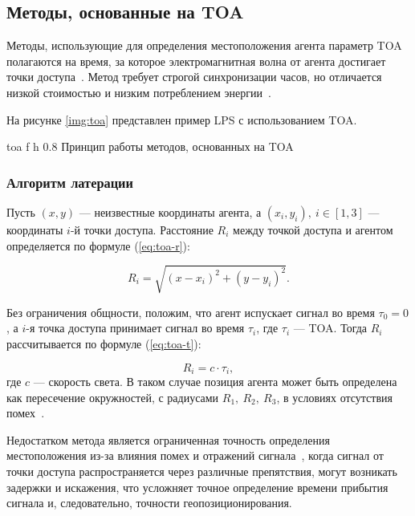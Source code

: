 \clearpage

\subsection{Методы, основанные на TOA}

Методы, использующие для определения местоположения агента параметр TOA полагаются на время, за которое электромагнитная волна от агента достигает точки доступа~\cite{trends}. Метод требует строгой синхронизации часов, но отличается низкой стоимостью и низким потреблением энергии~\cite{toa}.

На рисунке \ref{img:toa} представлен пример LPS с использованием TOA.

    {toa}
    {f}
    {h}
    {0.8\linewidth}
    {Принцип работы методов, основанных на TOA}

\subsubsection{Алгоритм латерации}

Пусть $(x, y)$ --- неизвестные координаты агента, а $(x_i, y_i),~i \in [1, 3]$ --- координаты $i$-й точки доступа. Расстояние $R_i$ между точкой доступа и агентом определяется по формуле (\ref{eq:toa-r}):

\begin{equation}
    R_i = \sqrt{(x - x_i)^2 + (y - y_i)^2}.
    \label{eq:toa-r}
\end{equation}

Без ограничения общности, положим, что агент испускает сигнал во время $\tau_0 = 0$, а $i$-я точка доступа принимает сигнал во время $\tau_i$, где $\tau_i$ --- TOA. Тогда $R_i$ рассчитывается по формуле (\ref{eq:toa-t}):

\begin{equation}
    R_i = c \cdot \tau_i,
    \label{eq:toa-t}
\end{equation}
где $c$ --- скорость света. В таком случае позиция агента может быть определена как пересечение окружностей, с радиусами $R_1,~R_2,~R_3$, в условиях отсутствия помех~\cite{toa}.

Недостатком метода является ограниченная точность определения местоположения из-за влияния помех и отражений сигнала~\cite{toa}, когда сигнал от точки доступа распространяется через различные препятствия, могут возникать задержки и искажения, что усложняет точное определение времени прибытия сигнала и, следовательно, точности геопозиционирования.

